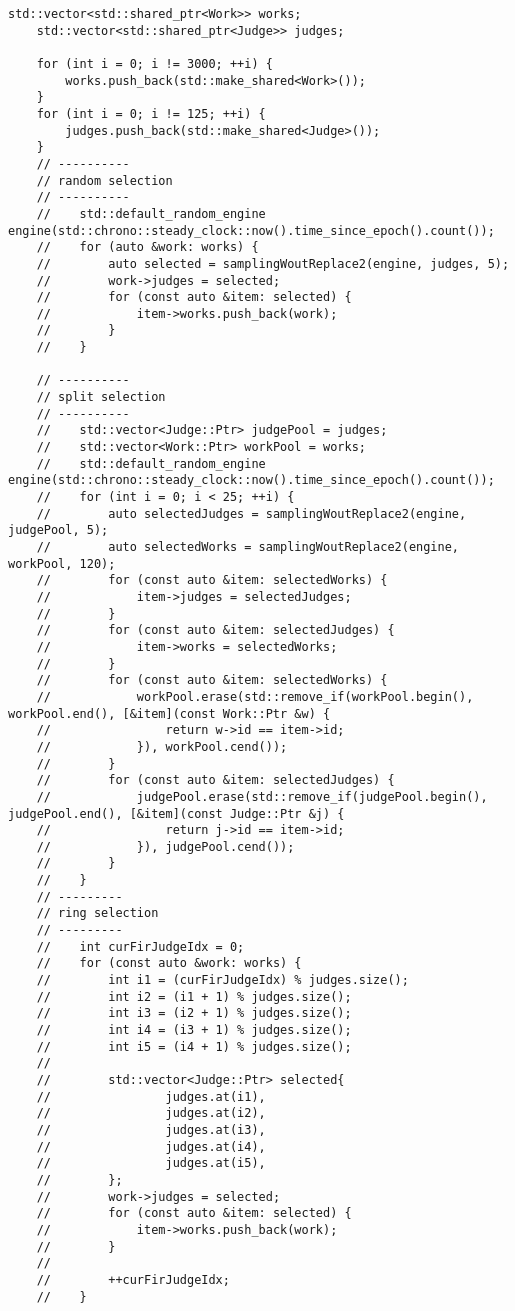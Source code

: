 \documentclass[bwprint]{gmcmthesis}
\begin{document}
\begin{lstlisting}[label=问题1,caption={问题1代码}]
	std::vector<std::shared_ptr<Work>> works;
    std::vector<std::shared_ptr<Judge>> judges;

    for (int i = 0; i != 3000; ++i) {
        works.push_back(std::make_shared<Work>());
    }
    for (int i = 0; i != 125; ++i) {
        judges.push_back(std::make_shared<Judge>());
    }
    // ----------
    // random selection
    // ----------
    //    std::default_random_engine engine(std::chrono::steady_clock::now().time_since_epoch().count());
    //    for (auto &work: works) {
    //        auto selected = samplingWoutReplace2(engine, judges, 5);
    //        work->judges = selected;
    //        for (const auto &item: selected) {
    //            item->works.push_back(work);
    //        }
    //    }
    
    // ----------
    // split selection
    // ----------
    //    std::vector<Judge::Ptr> judgePool = judges;
    //    std::vector<Work::Ptr> workPool = works;
    //    std::default_random_engine engine(std::chrono::steady_clock::now().time_since_epoch().count());
    //    for (int i = 0; i < 25; ++i) {
    //        auto selectedJudges = samplingWoutReplace2(engine, judgePool, 5);
    //        auto selectedWorks = samplingWoutReplace2(engine, workPool, 120);
    //        for (const auto &item: selectedWorks) {
    //            item->judges = selectedJudges;
    //        }
    //        for (const auto &item: selectedJudges) {
    //            item->works = selectedWorks;
    //        }
    //        for (const auto &item: selectedWorks) {
    //            workPool.erase(std::remove_if(workPool.begin(), workPool.end(), [&item](const Work::Ptr &w) {
    //                return w->id == item->id;
    //            }), workPool.cend());
    //        }
    //        for (const auto &item: selectedJudges) {
    //            judgePool.erase(std::remove_if(judgePool.begin(), judgePool.end(), [&item](const Judge::Ptr &j) {
    //                return j->id == item->id;
    //            }), judgePool.cend());
    //        }
    //    }
    // ---------
    // ring selection
    // ---------
    //    int curFirJudgeIdx = 0;
    //    for (const auto &work: works) {
    //        int i1 = (curFirJudgeIdx) % judges.size();
    //        int i2 = (i1 + 1) % judges.size();
    //        int i3 = (i2 + 1) % judges.size();
    //        int i4 = (i3 + 1) % judges.size();
    //        int i5 = (i4 + 1) % judges.size();
    //
    //        std::vector<Judge::Ptr> selected{
    //                judges.at(i1),
    //                judges.at(i2),
    //                judges.at(i3),
    //                judges.at(i4),
    //                judges.at(i5),
    //        };
    //        work->judges = selected;
    //        for (const auto &item: selected) {
    //            item->works.push_back(work);
    //        }
    //
    //        ++curFirJudgeIdx;
    //    }


\end{lstlisting}
\end{document}
